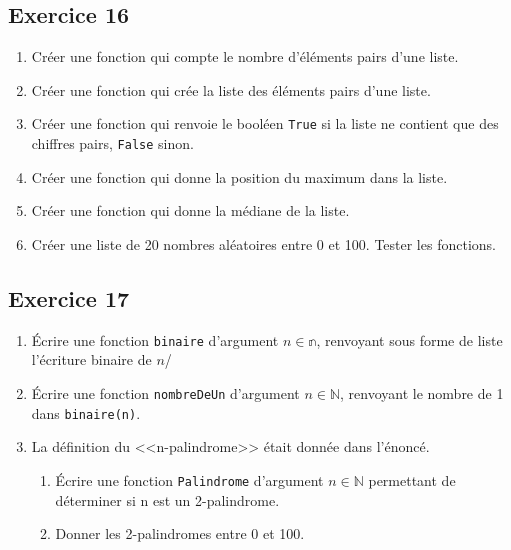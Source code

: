 \documentclass[10pt,fleqn]{article} %
\begin{document}
\begin{multicols}{2}
\subsection*{Exercice 16}
\begin{enumerate}
\item Créer une fonction qui compte le nombre d'éléments pairs d'une liste. 
\item Créer une fonction qui crée la liste des éléments pairs d'une liste. 
\item Créer une fonction qui renvoie le booléen \texttt{True} si la liste ne contient que des chiffres pairs, \texttt{False} sinon. 
\item Créer une fonction qui donne la position du maximum dans la liste. 
\item Créer une fonction qui donne la médiane de la liste. 
\item Créer une liste de 20 nombres aléatoires entre 0 et 100. Tester les fonctions. 
\end{enumerate}

\subsection*{Exercice 17}
\begin{enumerate}
\item Écrire une fonction \texttt{binaire} d'argument $n\in\mathbb{n}$, renvoyant sous forme de liste l'écriture binaire de $n$/
\item Écrire une fonction \texttt{nombreDeUn} d'argument $n\in \mathbb{N}$, renvoyant le nombre de 1 dans \texttt{binaire(n)}. 
\item La définition du <<n-palindrome>> était donnée dans l'énoncé.
\begin{enumerate}
\item Écrire une fonction \texttt{Palindrome} d'argument $n\in \mathbb{N}$ permettant de déterminer si n est un 2-palindrome.
\item Donner les 2-palindromes entre 0 et 100.
\end{enumerate}
\end{enumerate}




\end{multicols}
\end{document}
